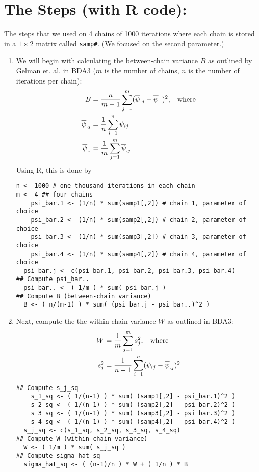 \documentclass[11pt]{article}\usepackage[]{graphicx}\usepackage[]{color}
\begin{document}
\section{The Steps (with R code):}
The steps that we used on 4 chains of 1000 iterations where each chain is stored in a $1\times 2$ matrix called \verb|samp#|. (We focused on the second parameter.)
\begin{enumerate}
\item We will begin with calculating the between-chain variance $B$ as outlined by Gelman et. al. in BDA3 ($m$ is the number of chains, $n$ is the number of iterations per chain):
{\color{blue} 
\begin{equation*}
\begin{split}
B & = \frac{n}{m-1}\sum_{j=1}^m (\overline{\psi}_{.j} - \overline{\psi}_{..})^2, \hspace{0.3cm} \text{where}\\
\overline{\psi}_{.j} & = \frac{1}{n} \sum_{i=1}^n \psi_{ij}\\
\overline{\psi}_{..} & = \frac{1}{m} \sum_{j=1}^m \overline{\psi}_{.j}
\end{split}
\end{equation*}
}
Using R, this is done by
{\color{red} 
\begin{verbatim}
n <- 1000 # one-thousand iterations in each chain
m <- 4 ## four chains
    psi_bar.1 <- (1/n) * sum(samp1[,2]) # chain 1, parameter of choice 
    psi_bar.2 <- (1/n) * sum(samp2[,2]) # chain 2, parameter of choice 
    psi_bar.3 <- (1/n) * sum(samp3[,2]) # chain 3, parameter of choice
    psi_bar.4 <- (1/n) * sum(samp4[,2]) # chain 4, parameter of choice
  psi_bar.j <- c(psi_bar.1, psi_bar.2, psi_bar.3, psi_bar.4)
## Compute psi_bar..
  psi_bar.. <- ( 1/m ) * sum( psi_bar.j )
## Compute B (between-chain variance)
  B <- ( n/(m-1) ) * sum( (psi_bar.j - psi_bar..)^2 )
\end{verbatim}
}

\item Next, compute the the within-chain variance $W$ as outlined in BDA3:
{\color{blue} 
\begin{equation*}
\begin{split}
W & = \frac{1}{m}\sum_{j=1}^m s_j^2, \hspace{0.3cm} \text{where}\\
s_j^2 & = \frac{1}{n-1} \sum_{i=1}^n (\psi_{ij} - \overline{\psi}_{.j})^2
\end{split}
\end{equation*}
}\vspace{-0.7cm}
{\color{red} 
\begin{verbatim}
## Compute s_j_sq
    s_1_sq <- ( 1/(n-1) ) * sum( (samp1[,2] - psi_bar.1)^2 )
    s_2_sq <- ( 1/(n-1) ) * sum( (samp2[,2] - psi_bar.2)^2 )
    s_3_sq <- ( 1/(n-1) ) * sum( (samp3[,2] - psi_bar.3)^2 )
    s_4_sq <- ( 1/(n-1) ) * sum( (samp4[,2] - psi_bar.4)^2 )
  s_j_sq <- c(s_1_sq, s_2_sq, s_3_sq, s_4_sq)
## Compute W (within-chain variance)
  W <- ( 1/m ) * sum( s_j_sq )
## Compute sigma_hat_sq
  sigma_hat_sq <- ( (n-1)/n ) * W + ( 1/n ) * B
\end{verbatim}
}


\end{enumerate}
\end{document}
